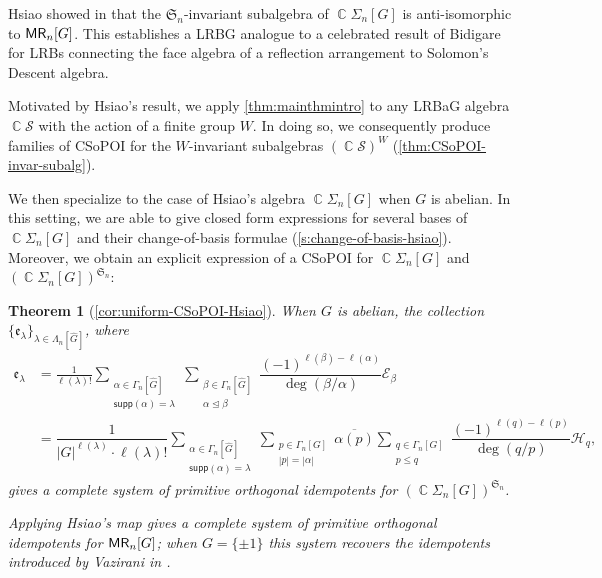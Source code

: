 \documentclass[11pt, oneside, reqno]{amsart}
\newtheorem{theorem}{Theorem}[section]
\theoremstyle{definition}
\numberwithin{equation}{section}
\DeclareMathOperator{\C}{\mathbb{C}}
\def \MR {{\sf{MR}}}
\def \SS{{\mathcal{S}}}
\def \cE{{\mathcal{E}}}
\def \kk{\C}
\def \ol{\overline}
\def \sym{\mathfrak{S}}
\def \ee{{\mathfrak{e}}}
\def \wh{\widehat}
\DeclareMathOperator{\chleq}{\unlhd}
\def \supp{\mathsf{supp}}
\newcommand{\SB}[1]{\mathcal{#1}} 		%
\newcommand{\abs}[1]{|{#1}|} 				%
\begin{document}
Hsiao showed in \cite{hsiao2007semigroup} that the $\sym_n$-invariant subalgebra of $\kk \Sigma_n[G]$ is anti-isomorphic to $\MR_n[G]$. This establishes a LRBG analogue to a celebrated result of Bidigare for LRBs connecting the face algebra of a reflection arrangement to Solomon's Descent algebra.

Motivated by Hsiao's result, we apply \cref{thm:mainthmintro} to any LRBaG algebra $\kk \SS$ with the action of a finite group $W$. In doing so, we consequently produce families of CSoPOI for the $W$-invariant subalgebras $(\kk \SS)^W$ (\cref{thm:CSoPOI-invar-subalg}).


We then specialize to the case of Hsiao's algebra $\kk \Sigma_n[G]$ when $G$ is abelian. In this setting, we are able to give closed form expressions for several bases of $\kk \Sigma_n[G]$ and their change-of-basis formulae (\cref{s:change-of-basis-hsiao}). Moreover, we obtain an explicit expression of a CSoPOI for $\kk \Sigma_n[G]$ and $(\kk \Sigma_n[G])^{\sym_n}$:


\begin{theorem}[\cref{cor:uniform-CSoPOI-Hsiao}]\label{thm:intro_mridem}
When $G$ is abelian, the collection $\{ \ee_{\lambda} \}_{\lambda \in \Lambda_n[\wh{G}]}$,
where
\begin{align*}
 \ee_{\lambda} &= \frac{1}{\ell(\lambda)!} \sum_{\substack{ \alpha \in \Gamma_n[\wh{G}] \\ \supp(\alpha) = \lambda}} \sum_{\substack{\beta \in \Gamma_n[\wh{G}] \\ \alpha \chleq \beta}} \dfrac{(-1)^{\ell(\beta)-\ell(\alpha)}}{\deg(\beta/\alpha)} \cE_\beta \\
 &= \dfrac{1}{|G|^{\ell(\lambda)} \cdot \ell(\lambda)!} \sum_{\substack{ \alpha \in \Gamma_n[\wh{G}] \\ \supp(\alpha) = \lambda}} \sum_{\substack{p \in \Gamma_n[G] \\ \abs{p} = \abs{\alpha} }} \ol{\alpha(p)} \sum_{\substack{q \in \Gamma_n[G] \\ p \leq q }} \dfrac{(-1)^{\ell(q)-\ell(p)}}{\deg(q/p)} \SB{H}_q,
\end{align*}
gives a complete system of primitive orthogonal idempotents
for $(\kk \Sigma_n[G])^{\sym_n}$.

Applying Hsiao's map gives a complete system of primitive orthogonal idempotents for $\MR_n[G]$; when $G = \{ \pm 1 \}$ this system recovers the idempotents introduced by Vazirani in \cite{vazirani}. 
\end{theorem}
\end{document}
